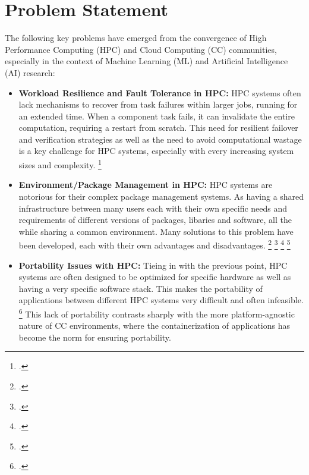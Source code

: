 \newpage

\section{Problem Statement}

The following key problems have emerged from the convergence of High Performance Computing (HPC) and Cloud Computing (CC) communities, especially in the context of Machine Learning (ML) and Artificial Intelligence (AI) research:

\begin{itemize}

    \item \textbf{Workload Resilience and Fault Tolerance in \ac{HPC}:} 
        \ac{HPC} systems often lack mechanisms to recover from task failures within
        larger jobs, running for an extended time.
        When a component task fails, it can invalidate the entire
        computation, requiring a restart from scratch.
        This need for resilient failover and verification strategies as well as the need to avoid
        computational wastage is a key challenge for \ac{HPC} systems, especially with every increasing system sizes and complexity.
        \footcite{egwutuohaSurveyFaultTolerance2013}

    \item \textbf{Environment/Package Management in \ac{HPC}:} 
        \ac{HPC} systems are notorious for their complex package management systems.
        As having a shared infrastructure between many users each with their own specific needs and requirements of different versions of packages, libaries and software,
        all the while sharing a common environment.
        Many solutions to this problem have been developed, each with their own advantages and disadvantages.
        \footcite{duboisWhyJohnnyCan2003} \footcite{bzeznikNixHPCPackage2017} \footcite{gamblinSpackPackageManager2015} \footcite{hosteEasyBuildBuildingSoftware2012}

    \item \textbf{Portability Issues with \ac{HPC}:}
        Tieing in with the previous point, \ac{HPC} systems are often designed to be optimized for specific hardware as well as having a very specific software stack.
        This makes the portability of applications between different \ac{HPC} systems very difficult and often infeasible. \footcite[p. 50]{canonCasePortabilityReproducibility2019}
        This lack of portability contrasts sharply with the more platform-agnostic nature of \ac{CC} environments, where the containerization of applications has become the norm for ensuring portability.


\end{itemize}
